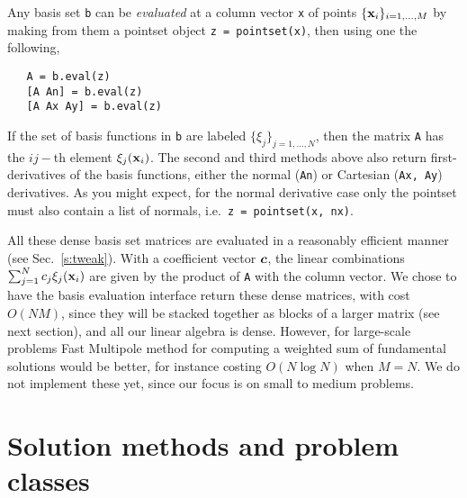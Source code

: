 \documentclass[12pt]{article}
\begin{document}
Any basis set {\tt b} can be {\em evaluated} at a column vector {\tt x}
of points $\{\textbf{x}_i\}_{i=1,\ldots,M}$
by making from them a pointset object {\tt z = pointset(x)},
then using one the following,
\begin{verbatim}
   A = b.eval(z)
   [A An] = b.eval(z)
   [A Ax Ay] = b.eval(z)
\end{verbatim}
If the set of basis functions in {\tt b} are labeled
$\{\xi_j\}_{j=1,\ldots,N}$, then
the matrix {\tt A} has the $ij-$th element $\xi_j(\textbf{x}_i)$. The
second and third methods above also return first-derivatives of the
basis functions, either the normal ({\tt An}) or Cartesian ({\tt Ax, Ay})
derivatives. As you might expect, for the normal derivative case only
the pointset must also contain a list of normals, i.e.\
 {\tt z = pointset(x, nx)}.

All these dense basis set matrices
are evaluated in a reasonably efficient manner
(see Sec.~\ref{s:tweak}).
With a coefficient vector ${\bm c}$, the linear combinations
$\sum_{j=1}^N c_j \xi_j(\textbf{x}_i)$ are given by the product
of {\tt A} with the column vector.
We chose to have the basis evaluation interface return these dense
matrices, with cost $O(NM)$,
since they will be stacked together as blocks of a larger
matrix (see next section), and all our linear algebra is dense.
However, for large-scale problems Fast Multipole method for computing
a weighted sum of fundamental solutions would be
better, for instance costing $O(N\log N)$ when $M=N$.
We do not implement these yet, since our focus is on small to medium
problems.




\section{Solution methods and problem classes}
\end{document}
